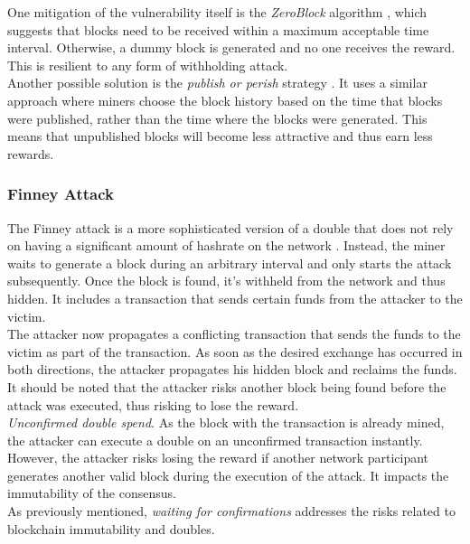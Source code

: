 \documentclass[12pt,a4paper]{article}
\begin{document}
One mitigation of the vulnerability itself is the \textit{ZeroBlock} algorithm \cite{zeroblock}, which suggests that blocks need to be received within a maximum acceptable time interval. Otherwise, a dummy block is generated and no one receives the reward. This is resilient to any form of withholding attack.\\

Another possible solution is the \textit{publish or perish} strategy \cite{perish}. It uses a similar approach where miners choose the block history based on the time that \glspl{block} were published, rather than the time where the \glspl{block} were generated. This means that unpublished \glspl{block} will become less attractive and thus earn less \glspl{reward}.

\subsubsection{Finney Attack}

The Finney attack is a more sophisticated version of a \gls{double} that does not rely on having a significant amount of \gls{hashrate} on the network \cite{survey}. Instead, the miner waits to generate a block during an arbitrary interval and only starts the attack subsequently. Once the block is found, it's withheld from the network and thus hidden. It includes a transaction that sends certain funds from the attacker to the victim.\\

The attacker now propagates a conflicting transaction that sends the funds to the victim as part of the transaction. As soon as the desired exchange has occurred in both directions, the attacker propagates his hidden block and reclaims the funds. It should be noted that the attacker risks another block being found before the attack was executed, thus risking to lose the \gls{reward}.\\

\textit{Unconfirmed double spend}. As the block with the transaction is already mined, the attacker can execute a \gls{double} on an unconfirmed transaction instantly. However, the attacker risks losing the \gls{reward} if another network participant generates another valid block during the execution of the attack. It impacts the immutability of the \gls{consensus}.\\

As previously mentioned, \textit{waiting for confirmations} addresses the risks related to blockchain immutability and \glspl{double}.\\
\end{document}
